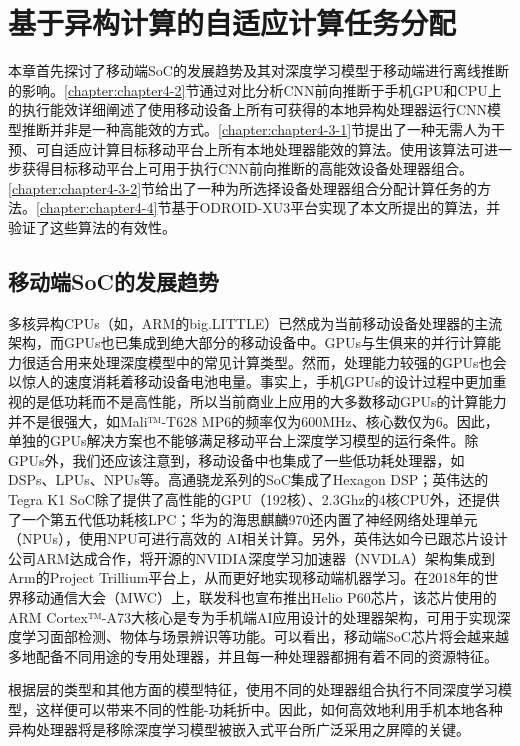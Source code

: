 \chapter{基于异构计算的自适应计算任务分配}
\label{chapter:chapter4}

本章首先探讨了移动端SoC的发展趋势及其对深度学习模型于移动端进行离线推断的影响。\ref{chapter:chapter4-2}节通过对比分析CNN前向推断于手机GPU和CPU上的执行能效详细阐述了使用移动设备上所有可获得的本地异构处理器运行CNN模型推断并非是一种高能效的方式。\ref{chapter:chapter4-3-1}节提出了一种无需人为干预、可自适应计算目标移动平台上所有本地处理器能效的算法。使用该算法可进一步获得目标移动平台上可用于执行CNN前向推断的高能效设备处理器组合。\ref{chapter:chapter4-3-2}节给出了一种为所选择设备处理器组合分配计算任务的方法。\ref{chapter:chapter4-4}节基于ODROID-XU3平台实现了本文所提出的算法，并验证了这些算法的有效性。

\section{移动端SoC的发展趋势}
\label{chapter:chapter4-1}
多核异构CPUs（如，ARM的big.LITTLE\cite{chung2012heterogeneous}）已然成为当前移动设备处理器的主流架构，而GPUs也已集成到绝大部分的移动设备中。GPUs与生俱来的并行计算能力很适合用来处理深度模型中的常见计算类型。然而，处理能力较强的GPUs也会以惊人的速度消耗着移动设备电池电量。事实上，手机GPUs的设计过程中更加重视的是低功耗而不是高性能，所以当前商业上应用的大多数移动GPUs的计算能力并不是很强大，如Mali™-T628 MP6的频率仅为600MHz、核心数仅为6。因此，单独的GPUs解决方案也不能够满足移动平台上深度学习模型的运行条件。除GPUs外，我们还应该注意到，移动设备中也集成了一些低功耗处理器，如DSPs、LPUs、NPUs等。高通骁龙系列的SoC集成了Hexagon DSP；英伟达的Tegra K1 SoC除了提供了高性能的GPU（192核）、2.3Ghz的4核CPU外，还提供了一个第五代低功耗核LPC；华为的海思麒麟970还内置了神经网络处理单元（NPUs），使用NPU可进行高效的 AI相关计算。另外，英伟达如今已跟芯片设计公司ARM达成合作，将开源的NVIDIA深度学习加速器（NVDLA）架构集成到Arm的Project Trillium平台上，从而更好地实现移动端机器学习。在2018年的世界移动通信大会（MWC）上，联发科也宣布推出Helio P60芯片，该芯片使用的ARM Cortex™-A73大核心是专为手机端AI应用设计的处理器架构，可用于实现深度学习面部检测、物体与场景辨识等功能。可以看出，移动端SoC芯片将会越来越多地配备不同用途的专用处理器，并且每一种处理器都拥有着不同的资源特征。

根据层的类型和其他方面的模型特征，使用不同的处理器组合执行不同深度学习模型，这样便可以带来不同的性能-功耗折中。因此，如何高效地利用手机本地各种异构处理器将是移除深度学习模型被嵌入式平台所广泛采用之屏障的关键\cite{attia2015dynamic}。

